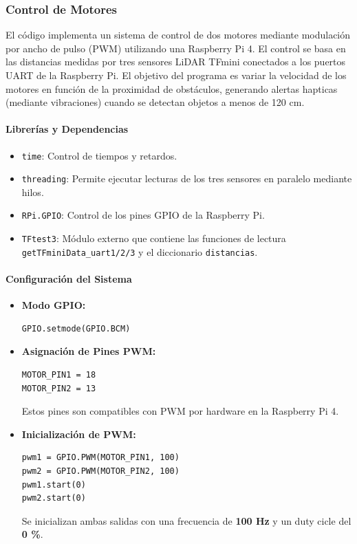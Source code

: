 \documentclass[12pt,a4paper]{article}
\begin{document}
\subsubsection{Control de Motores}

El código implementa un sistema de control de dos motores mediante modulación por ancho de pulso (PWM) utilizando una Raspberry Pi 4.  
El control se basa en las distancias medidas por tres sensores LiDAR TFmini conectados a los puertos UART de la Raspberry Pi.  
El objetivo del programa es variar la velocidad de los motores en función de la proximidad de obstáculos, generando alertas hapticas (mediante vibraciones) cuando se detectan objetos a menos de 120 cm.


\paragraph{Librerías y Dependencias}

\begin{itemize}
    \item \texttt{time}: Control de tiempos y retardos.
    \item \texttt{threading}: Permite ejecutar lecturas de los tres sensores en paralelo mediante hilos.
    \item \texttt{RPi.GPIO}: Control de los pines GPIO de la Raspberry Pi.
    \item \texttt{TFtest3}: Módulo externo que contiene las funciones de lectura \texttt{getTFminiData\_uart1/2/3} y el diccionario \texttt{distancias}.
\end{itemize}

\paragraph{Configuración del Sistema}

\begin{itemize}
    \item\textbf{Modo GPIO:}

\begin{verbatim}
GPIO.setmode(GPIO.BCM)
\end{verbatim}

\item\textbf{Asignación de Pines PWM:}
\begin{verbatim}
MOTOR_PIN1 = 18
MOTOR_PIN2 = 13
\end{verbatim}

Estos pines son compatibles con PWM por hardware en la Raspberry Pi 4.

\item\textbf{Inicialización de PWM:}
\begin{verbatim}
pwm1 = GPIO.PWM(MOTOR_PIN1, 100)
pwm2 = GPIO.PWM(MOTOR_PIN2, 100)
pwm1.start(0)
pwm2.start(0)
\end{verbatim}

Se inicializan ambas salidas con una frecuencia de \textbf{100 Hz} y un duty cicle del \textbf{0 \%}.
\end{itemize}
\end{document}
